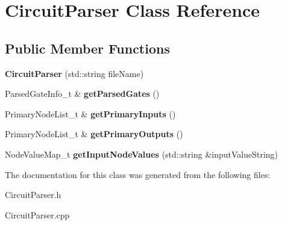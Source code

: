 \hypertarget{classCircuitParser}{}\section{Circuit\+Parser Class Reference}
\label{classCircuitParser}
\subsection*{Public Member Functions}
\begin{DoxyCompactItemize}
\item 
{\bfseries Circuit\+Parser} (std\+::string file\+Name)\hypertarget{classCircuitParser_a0571f18af9fe330ad800f64e1dd06b13}{}\label{classCircuitParser_a0571f18af9fe330ad800f64e1dd06b13}

\item 
Parsed\+Gate\+Info\+\_\+t \& {\bfseries get\+Parsed\+Gates} ()\hypertarget{classCircuitParser_ae39eda3f3324cda0c1f50e6db8ef8600}{}\label{classCircuitParser_ae39eda3f3324cda0c1f50e6db8ef8600}

\item 
Primary\+Node\+List\+\_\+t \& {\bfseries get\+Primary\+Inputs} ()\hypertarget{classCircuitParser_a356fa2a4b05294eefab842d5cfb60153}{}\label{classCircuitParser_a356fa2a4b05294eefab842d5cfb60153}

\item 
Primary\+Node\+List\+\_\+t \& {\bfseries get\+Primary\+Outputs} ()\hypertarget{classCircuitParser_ae09c701815a66d8e217b4cb7082af0b2}{}\label{classCircuitParser_ae09c701815a66d8e217b4cb7082af0b2}

\item 
Node\+Value\+Map\+\_\+t {\bfseries get\+Input\+Node\+Values} (std\+::string \&input\+Value\+String)\hypertarget{classCircuitParser_aa2e894e75fb90c33c745c13295cf616a}{}\label{classCircuitParser_aa2e894e75fb90c33c745c13295cf616a}

\end{DoxyCompactItemize}


The documentation for this class was generated from the following files\+:\begin{DoxyCompactItemize}
\item 
Circuit\+Parser.\+h\item 
Circuit\+Parser.\+cpp\end{DoxyCompactItemize}
